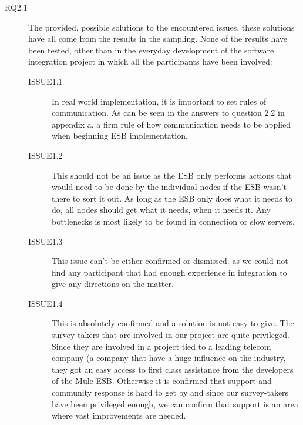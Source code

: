 \documentclass{llncs}
\begin{document}
\begin{description}
\item[RQ2.1] The provided, possible solutions to the encountered issues, these solutions have all come from the results in the sampling. None of the results have been tested, other than in the everyday development of the software integration project in which all the participants have been involved:
\begin{description}

\item[ISSUE1.1] In real world implementation, it is important to set rules of communication. As can be seen in the answers to question 2.2 in appendix a, a firm rule of how communication needs to be applied when beginning ESB implementation. 
\item[ISSUE1.2] This should not be an issue as the ESB only performs actions that would need to be done by the individual nodes if the ESB wasn’t there to sort it out. As long as the ESB only does what it needs to do, all nodes should get what it needs, when it needs it. Any bottlenecks is most likely to be found in connection or slow servers.
\item[ISSUE1.3] This issue can’t be either confirmed or dismissed. as we could not find any participant that had enough experience in integration to give any directions on the matter.
\item[ISSUE1.4] This is absolutely confirmed and a solution is not easy to give. The survey-takers that are involved in our project are quite privileged. Since they are involved in a project tied to a leading telecom company (a company that have a huge influence on the industry, they got an easy access to first class assistance from the developers of the Mule ESB. Otherwise it is confirmed that support and community response is hard to get by and since our survey-takers have been privileged enough, we can confirm that support is an area where vast improvements are needed. 
\end{description}


\end{description}
\end{document}
